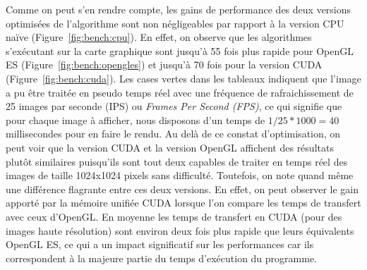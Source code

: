 \begin{table}[H]
\centering
\caption{CPU - Convolution d'une image en niveau de gris par un filtre de taille 5x5 - float 32bits}
\label{fig:bench:cpu}
\end{table}

Comme on peut s'en rendre compte, les gains de performance des deux versions optimisées de l'algorithme sont non négligeables par rapport à la version CPU naïve (Figure~\ref{fig:bench:cpu}). En effet, on observe que les algorithmes s'exécutant sur la carte graphique sont jusqu'à 55 fois plus rapide pour OpenGL ES (Figure~\ref{fig:bench:opengles}) et jusqu'à 70 fois pour la version CUDA (Figure~\ref{fig:bench:cuda}). Les cases vertes dans les tableaux indiquent que l'image a pu être traitée en pseudo temps réel avec une fréquence de rafraichissement de 25 images par seconde (IPS) ou \emph{Frames Per Second (FPS)}, ce qui signifie que pour chaque image à afficher, nous disposons d'un temps de $1/25 * 1000 = 40$ millisecondes pour en faire le rendu. Au delà de ce constat d'optimisation, on peut voir que la version CUDA et la version OpenGL affichent des résultats plutôt similaires puisqu'ils sont tout deux capables de traiter en temps réel des images de taille 1024x1024 pixels sans difficulté. Toutefois, on note quand même une différence flagrante entre ces deux versions. En effet, on peut observer le gain apporté par la mémoire unifiée CUDA lorsque l'on compare les temps de transfert avec ceux d'OpenGL. En moyenne les temps de transfert en CUDA (pour des images haute résolution) sont environ deux fois plus rapide que leurs équivalents OpenGL ES, ce qui a un impact significatif sur les performances car ils correspondent à la majeure partie du temps d'exécution du programme.

